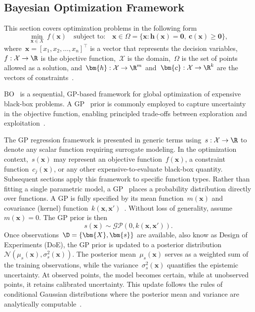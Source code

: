 \subsection{Bayesian Optimization Framework}\label{subsec:bayesopt}
This section covers optimization problems in the following form
\begin{equation}
  \min_{\bm{x}\in X}~
  f(\bm{x})\quad
  \text{subject to:}\quad
  \bm{x}\in\Omega=\{\bm{x}:\bm{h}(\bm{x})=\bm{0},~\bm{c}(\bm{x})\ge\bm{0}\},
  \tag{\(P\)}\label{prob:basic}
\end{equation}
where~\(\bm{x}={[x_1, x_2, \ldots, x_n]}^\top\) is a vector that represents the decision variables,~\(f:\mathcal{X}\rightarrow\R\) is the objective function,~\(\mathcal{X}\) is the domain,~\(\Omega\) is the set of points allowed as a solution, and~\(\bm{h}:\mathcal{X}\rightarrow\R^m\) and~\(\bm{c}:\mathcal{X}\rightarrow\R^k\) are the vectors of constraints~\cite{audet2021}.

BO~\cite{frazier2018,jones1998,shahriari2016} is a sequential, GP-based framework for global optimization of expensive black-box problems. A GP~\cite{rasmussen2005} prior is commonly employed to capture uncertainty in the objective function, enabling principled trade-offs between exploration and exploitation~\cite{cordelier2025}.

The GP regression framework is presented in generic terms using~\(s:\mathcal{X}\to\R\) to denote any scalar function requiring surrogate modeling. In the optimization context,~\(s(\bm{x})\) may represent an objective function~\(f(\bm{x})\), a constraint function~\(c_j(\bm{x})\), or any other expensive-to-evaluate black-box quantity. Subsequent sections apply this framework to specific function types.
Rather than fitting a single parametric model, a GP~\cite{rasmussen2005} places a probability distribution directly over functions. A GP is fully specified by its mean function~\(m(\bm{x})\) and covariance (kernel) function~\(k(\bm{x}, \bm{x}')\)~\cite{rasmussen2005}. Without loss of generality, assume~\(m(\bm{x}) = 0\). The GP prior is then
\begin{equation*}
  s(\bm{x}) \sim \mathcal{GP}\left(0, k(\bm{x}, \bm{x}')\right).
\end{equation*}
Once observations~\(\D=\{\bm{X}, \bm{s}\}\) are available, also know as Design of Experiments (DoE), the GP prior is updated to a posterior distribution~\(\mathcal{N}(\mu_s(\bm{x}), \sigma_s^2(\bm{x}))\). The posterior mean~\(\mu_s(\bm{x})\) serves as a weighted sum of the training observations, while the variance~\(\sigma_s^2(\bm{x})\) quantifies the epistemic uncertainty. At observed points, the model becomes certain, while at unobserved points, it retains calibrated uncertainty. This update follows the rules of conditional Gaussian distributions where the posterior mean and variance are analytically computable~\cite{rasmussen2005}.

